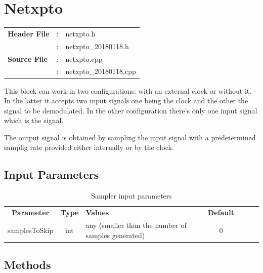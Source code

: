\clearpage

\section{Netxpto}

\begin{tcolorbox}	
	\begin{tabular}{p{2.75cm} p{0.2cm} p{10.5cm}} 	
		\textbf{Header File}   &:& netxpto.h\\
                               &:& netxpto\_20180118.h\\
		\textbf{Source File}   &:& netxpto.cpp \\
                               &:& netxpto\_20180118.cpp \\
	\end{tabular}
\end{tcolorbox}

This block can work in two configurations: with an external clock or without it. In the latter it accepts two input signals one being the clock and the other the signal to be demodulated. In the other configuration there's only one input signal which is the signal.

The output signal is obtained by sampling the input signal with a predetermined samplig rate provided either internally or by the clock.

\subsection*{Input Parameters}

\begin{table}[h]
	\centering
	\begin{tabular}{|c|c|p{60mm}|c|ccp{60mm}}
		\cline{1-4}
		\textbf{Parameter} & \textbf{Type} & \textbf{Values} &   \textbf{Default}& \\ \cline{1-4}
		samplesToSkip & int & any (smaller than the number of samples generated) & $0$ \\ \cline{1-4}
	\end{tabular}
	\caption{Sampler input parameters}
	\label{table:sampler_in_par}
\end{table}


\subsection*{Methods}

